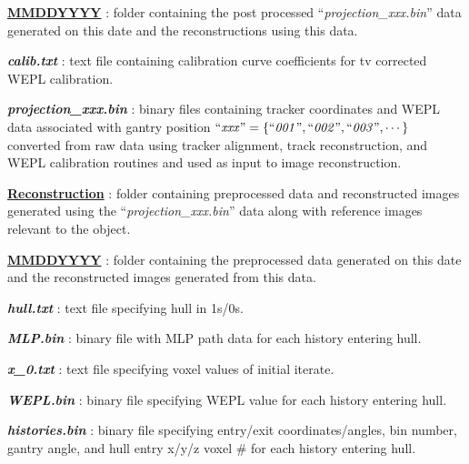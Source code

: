 \documentclass{article}
\begin{document}
\begin{myEnumerate}[labelindent=0pt, leftmargin=*]
\begin{myEnumerate}[labelindent=1pt, leftmargin=*]
\begin{myEnumerate}[labelindent=1pt, leftmargin=*]
\begin{myEnumerate}[labelindent=1pt, leftmargin=*]
\begin{myEnumerate}[labelindent=1pt, leftmargin=*]
                    \begin{myEnumerate}[labelindent=1pt, leftmargin=*]
                        \item \ul{\textbf{MMDDYYYY}} : folder containing the post processed ``\textit{projection\_xxx.bin}'' data generated on this date and the reconstructions using this data.
                        \begin{myEnumerate}[labelindent=1pt, leftmargin=*]
                            \item \textbf{\textit{calib.txt}} : text file containing calibration curve coefficients for tv corrected WEPL calibration.
                            \item \textbf{\textit{projection\_xxx.bin}} : binary files containing tracker coordinates and WEPL data associated with gantry position $\textrm{``\textit{xxx}''} =\{\textrm{``\textit{001}''}, \textrm{``\textit{002}''}, \textrm{``\textit{003}''}, \cdots\}$ converted from raw data using tracker alignment, track reconstruction, and WEPL calibration routines and used as input to image reconstruction.
                            \item \ul{\textbf{Reconstruction}} : folder containing preprocessed data and reconstructed images generated using the ``\textit{projection\_xxx.bin}'' data along with reference images relevant to the object.
                            \begin{myEnumerate}[labelindent=1pt, leftmargin=*]
                                \item \ul{\textbf{MMDDYYYY}} : folder containing the preprocessed data generated on this date and the reconstructed images generated from this data.
                                \begin{myEnumerate}[labelindent=1pt, leftmargin=*]
                                    \item \textbf{\textit{hull.txt}} : text file specifying hull in 1s/0s.
                                    \item \textbf{\textit{MLP.bin}} : binary file with MLP path data for each history entering hull.
                                    \item \textbf{\textit{x\_0.txt}} : text file specifying voxel values of initial iterate.
                                    \item \textbf{\textit{WEPL.bin}} : binary file specifying WEPL value for each history entering hull.
                                    \item \textbf{\textit{histories.bin}} : binary file specifying entry/exit coordinates/angles, bin number, gantry angle, and hull entry x/y/z voxel \# for each history entering hull.

\end{myEnumerate}
\end{myEnumerate}
\end{myEnumerate}
\end{myEnumerate}
\end{myEnumerate}
\end{myEnumerate}
\end{myEnumerate}
\end{myEnumerate}
\end{myEnumerate}
\end{document}
